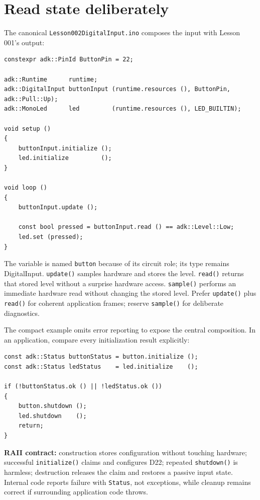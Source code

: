 \documentclass[11pt]{article}
\begin{document}
\section{Read state deliberately}

The canonical \texttt{Lesson002DigitalInput.ino} composes the input with Lesson
001's output:

\begin{lstlisting}[style=adkcpp]
constexpr adk::PinId ButtonPin = 22;

adk::Runtime      runtime;
adk::DigitalInput buttonInput (runtime.resources (), ButtonPin, adk::Pull::Up);
adk::MonoLed      led         (runtime.resources (), LED_BUILTIN);

void setup ()
{
    buttonInput.initialize ();
    led.initialize         ();
}

void loop ()
{
    buttonInput.update ();

    const bool pressed = buttonInput.read () == adk::Level::Low;
    led.set (pressed);
}
\end{lstlisting}

The variable is named \texttt{button} because of its circuit role; its type remains
DigitalInput. \texttt{update()} samples hardware and stores the level.
\texttt{read()} returns that stored level without a surprise hardware access.
\texttt{sample()} performs an immediate hardware read without changing the stored
level. Prefer \texttt{update()} plus \texttt{read()} for coherent application
frames; reserve \texttt{sample()} for deliberate diagnostics.

The compact example omits error reporting to expose the central composition. In
an application, compare every initialization result explicitly:

\begin{lstlisting}[style=adkcpp]
const adk::Status buttonStatus = button.initialize ();
const adk::Status ledStatus    = led.initialize    ();

if (!buttonStatus.ok () || !ledStatus.ok ())
{
    button.shutdown ();
    led.shutdown    ();
    return;
}
\end{lstlisting}

\textbf{RAII contract:} construction stores configuration without touching
hardware; successful \texttt{initialize()} claims and configures D22; repeated
\texttt{shutdown()} is harmless; destruction releases the claim and restores a
passive input state. Internal code reports failure with \texttt{Status}, not
exceptions, while cleanup remains correct if surrounding application code throws.
\end{document}
